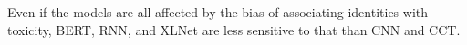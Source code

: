 \documentclass[a4paper,english]{rnti}
\begin{document}
Even if the models are all affected by the bias of associating identities with toxicity, BERT, RNN, and XLNet are less sensitive to that than CNN and CCT.














































































\Eng
\end{document}

